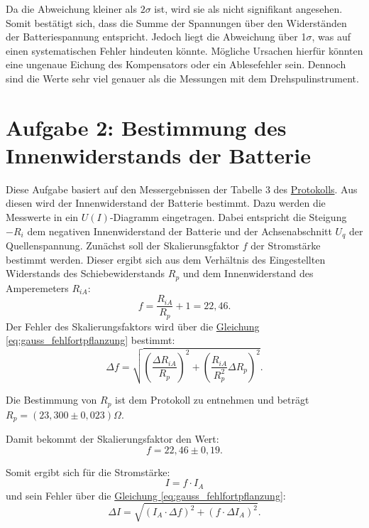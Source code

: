 Da die Abweichung kleiner als $2\sigma$ ist, wird sie als nicht signifikant angesehen. Somit bestätigt sich, dass die Summe der Spannungen über den Widerständen der Batteriespannung entspricht. Jedoch liegt die Abweichung über 1$\sigma$, was auf einen systematischen Fehler hindeuten könnte. Mögliche Ursachen hierfür könnten eine ungenaue Eichung des Kompensators oder ein Ablesefehler sein. Dennoch sind die Werte sehr viel genauer als die Messungen mit dem Drehspulinstrument.
\section{Aufgabe 2: Bestimmung des Innenwiderstands der Batterie}
Diese Aufgabe basiert auf den Messergebnissen der Tabelle 3 des \hyperref[Protokoll]{Protokolls}. Aus diesen wird der Innenwiderstand der Batterie bestimmt. Dazu werden die Messwerte in ein $U(I)$-Diagramm eingetragen. Dabei entspricht die Steigung $-R_i$ dem negativen Innenwiderstand der Batterie und der Achsenabschnitt $U_q$ der Quellenspannung.
Zunächst soll der Skalierunsgfaktor $f$ der Stromstärke bestimmt werden. Dieser ergibt sich aus dem Verhältnis des Eingestellten Widerstands des Schiebewiderstands $R_p$ und dem Innenwiderstand des Amperemeters $R_{iA}$:
\begin{equation}
    f = \frac{R_{iA}}{R_p} + 1 = 22,46.
    \label{eq:skalierungsfaktor}
\end{equation}
Der Fehler des Skalierungsfaktors wird über die \hyperref[eq:gauss_fehlfortpflanzung]{Gleichung \ref*{eq:gauss_fehlfortpflanzung}} bestimmt:
\begin{equation}
    \Delta f = \sqrt{\left( \frac{\Delta R_{iA}}{R_p}  \right)^2 + \left(\frac{R_{iA}}{R_p^2} \Delta R_p \right)^2}.
\end{equation}

Die Bestimmung von $R_p$ ist dem Protokoll zu entnehmen und beträgt $R_p = (23,300 \pm 0,023)\Omega$. 

Damit bekommt der Skalierungsfaktor den Wert:
\begin{equation}
    \boxed{
        f = 22,46 \pm 0,19.
    }
\end{equation}

Somit ergibt sich für die Stromstärke:
\begin{equation}
    I = f \cdot I_A
\end{equation}
und sein Fehler über die \hyperref[eq:gauss_fehlfortpflanzung]{Gleichung \ref*{eq:gauss_fehlfortpflanzung}}:
\begin{equation}
    \Delta I = \sqrt{(I_A \cdot \Delta f)^2 + (f \cdot \Delta I_A)^2}.
\end{equation}

